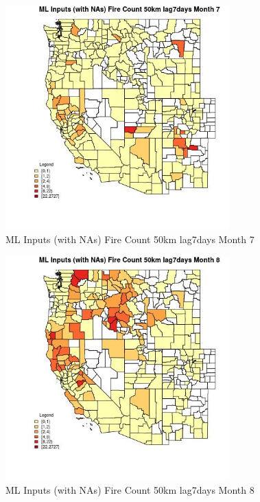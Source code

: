 \begin{figure} 
\centering  
\includegraphics[width=0.77\textwidth]{Code_Outputs/Report_ML_input_PM25_Step4_part_f_de_duplicated_aves_prioritize_24hr_obswNAs_CountyFire_Count_50km_lag7daysmedianMonth7.jpg} 
\caption{\label{fig:Report_ML_input_PM25_Step4_part_f_de_duplicated_aves_prioritize_24hr_obswNAsCountyFire_Count_50km_lag7daysmedianMonth7}ML Inputs (with NAs) Fire Count 50km lag7days Month 7} 
\end{figure} 
 

\begin{figure} 
\centering  
\includegraphics[width=0.77\textwidth]{Code_Outputs/Report_ML_input_PM25_Step4_part_f_de_duplicated_aves_prioritize_24hr_obswNAs_CountyFire_Count_50km_lag7daysmedianMonth8.jpg} 
\caption{\label{fig:Report_ML_input_PM25_Step4_part_f_de_duplicated_aves_prioritize_24hr_obswNAsCountyFire_Count_50km_lag7daysmedianMonth8}ML Inputs (with NAs) Fire Count 50km lag7days Month 8} 
\end{figure} 
 

